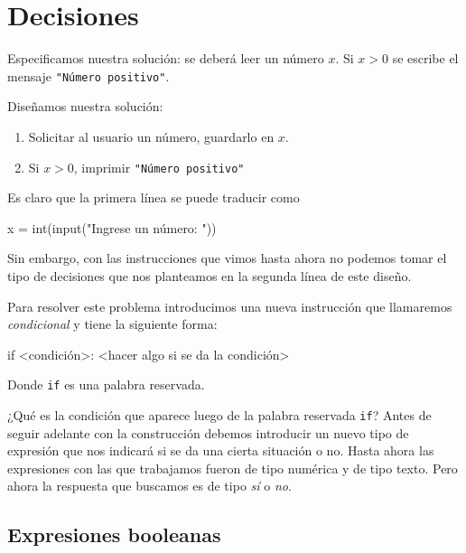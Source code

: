 \chapter{Decisiones}


\begin{solucion}
Especificamos nuestra solución: se deberá leer un número $x$.
Si $x > 0$ se escribe el mensaje \lstinline!"Número positivo"!.

Diseñamos nuestra solución:

\begin{enumerate}
\item Solicitar al usuario un número, guardarlo en $x$.
\item Si $x > 0$, imprimir \lstinline!"Número positivo"!
\end{enumerate}

Es claro que la primera línea se puede traducir como
\begin{codigo-python-sn}
    x = int(input("Ingrese un número: "))
\end{codigo-python-sn}

Sin embargo, con las instrucciones que vimos hasta ahora no podemos tomar
el tipo de decisiones que nos planteamos en la segunda línea de este
diseño.
\end{solucion}

Para resolver este problema introducimos una nueva instrucción que
llamaremos {\it condicional} y tiene la siguiente forma:

\begin{codigo-python-sn}
if <condición>:
    <hacer algo si se da la condición>
\end{codigo-python-sn}

Donde \lstinline+if+ es una palabra reservada.

¿Qué es la condición que aparece luego de la palabra reservada \lstinline+if+?
Antes de seguir adelante con la construcción debemos introducir
un nuevo tipo de expresión que nos indicará si se da una cierta situación o no.
Hasta ahora las expresiones con las que trabajamos fueron de tipo numérica y de tipo texto.
Pero ahora la respuesta que buscamos es de tipo {\it sí} o {\it no}.

\section{Expresiones booleanas}

